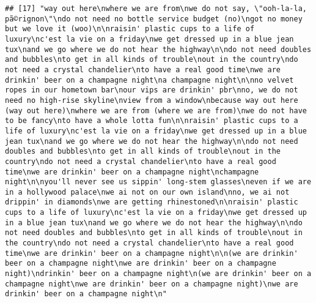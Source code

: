 \documentclass[]{article}
\begin{document}
\begin{verbatim}
## [17] "way out here\nwhere we are from\nwe do not say, \"ooh-la-la, pã©rignon\"\ndo not need no bottle service budget (no)\ngot no money but we love it (woo)\n\nraisin' plastic cups to a life of luxury\nc'est la vie on a friday\nwe get dressed up in a blue jean tux\nand we go where we do not hear the highway\n\ndo not need doubles and bubbles\nto get in all kinds of trouble\nout in the country\ndo not need a crystal chandelier\nto have a real good time\nwe are drinkin' beer on a champagne night\na champagne night\n\nno velvet ropes in our hometown bar\nour vips are drinkin' pbr\nno, we do not need no high-rise skyline\nview from a window\nbecause way out here (way out here)\nwhere we are from (where we are from)\nwe do not have to be fancy\nto have a whole lotta fun\n\nraisin' plastic cups to a life of luxury\nc'est la vie on a friday\nwe get dressed up in a blue jean tux\nand we go where we do not hear the highway\n\ndo not need doubles and bubbles\nto get in all kinds of trouble\nout in the country\ndo not need a crystal chandelier\nto have a real good time\nwe are drinkin' beer on a champagne night\nchampagne night\n\nyou'll never see us sippin' long-stem glasses\neven if we are in a hollywood palace\nwe ai not on our own island\nno, we ai not drippin' in diamonds\nwe are getting rhinestoned\n\nraisin' plastic cups to a life of luxury\nc'est la vie on a friday\nwe get dressed up in a blue jean tux\nand we go where we do not hear the highway\n\ndo not need doubles and bubbles\nto get in all kinds of trouble\nout in the country\ndo not need a crystal chandelier\nto have a real good time\nwe are drinkin' beer on a champagne night\n\n(we are drinkin' beer on a champagne night\nwe are drinkin' beer on a champagne night)\ndrinkin' beer on a champagne night\n(we are drinkin' beer on a champagne night\nwe are drinkin' beer on a champagne night)\nwe are drinkin' beer on a champagne night\n"                                                                                                                                                                                                                                                                                                                                                                                                                                                                                                                                                                                                                                                                                                                                                                                                                                                                                                                                                                                            

\end{verbatim}
\end{document}
